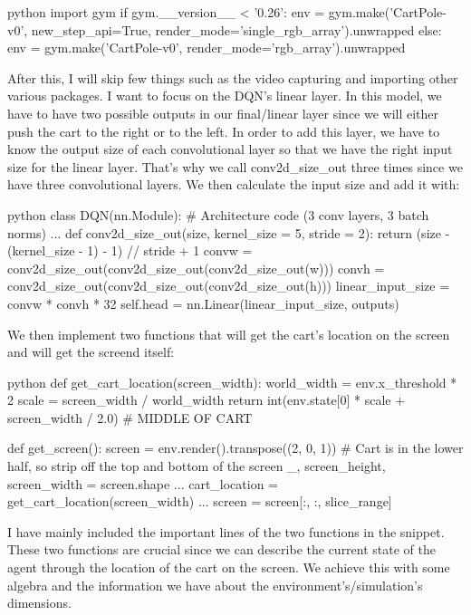 \documentclass{article}
\numberwithin{equation}{section}
\numberwithin{equation}{section}
\begin{document}
\begin{mintedbox}{python}
import gym
if gym.__version__ < '0.26':
    env = gym.make('CartPole-v0', new_step_api=True, render_mode='single_rgb_array').unwrapped
else:
    env = gym.make('CartPole-v0', render_mode='rgb_array').unwrapped
\end{mintedbox}

After this, I will skip few things such as the video capturing and importing other various packages. I want to focus on the DQN's linear layer. In this model, we have to have two possible outputs in our final/linear layer since we will either push the cart to the right or to the left. In order to add this layer, we have to know the output size of each convolutional layer so that we have the right input size for the linear layer. That's why we call conv2d\_size\_out three times since we have three convolutional layers. We then calculate the input size and add it with: 

\begin{mintedbox}{python}
class DQN(nn.Module):
# Architecture code (3 conv layers, 3 batch norms)
...
        def conv2d_size_out(size, kernel_size = 5, stride = 2):
            return (size - (kernel_size - 1) - 1) // stride  + 1
        convw = conv2d_size_out(conv2d_size_out(conv2d_size_out(w)))
        convh = conv2d_size_out(conv2d_size_out(conv2d_size_out(h)))
        linear_input_size = convw * convh * 32
        self.head = nn.Linear(linear_input_size, outputs)
\end{mintedbox}

We then implement two functions that will get the cart's location on the screen and will get the screend itself:

\begin{mintedbox}{python}
def get_cart_location(screen_width):
world_width = env.x_threshold * 2
    scale = screen_width / world_width
    return int(env.state[0] * scale + screen_width / 2.0)  # MIDDLE OF CART

def get_screen():
screen = env.render().transpose((2, 0, 1))
    # Cart is in the lower half, so strip off the top and bottom of the screen
    _, screen_height, screen_width = screen.shape
...
cart_location = get_cart_location(screen_width)
...
screen = screen[:, :, slice_range]
\end{mintedbox}

I have mainly included the important lines of the two functions in the snippet. These two functions are crucial since we can describe the current state of the agent through the location of the cart on the screen. We achieve this with some algebra and the information we have about the environment's/simulation's dimensions. \\
\end{document}
